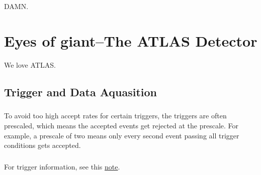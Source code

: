 \begin{savequote}[75mm]
DAMN.
\end{savequote}

\chapter{Eyes of giant--The ATLAS Detector}

We love ATLAS.

\section{Trigger and Data Aquasition}
\paragraph{}
To avoid too high accept rates for certain triggers, the triggers are often prescaled, which means the accepted events get rejected at the prescale. For example, a prescale of two means only every second event passing all trigger conditions gets accepted. 

\paragraph{}
For trigger information, see this \href{http://atlas.web.cern.ch/Atlas/GROUPS/PHYSICS/PAPERS/TRIG-2016-01/}{note}.